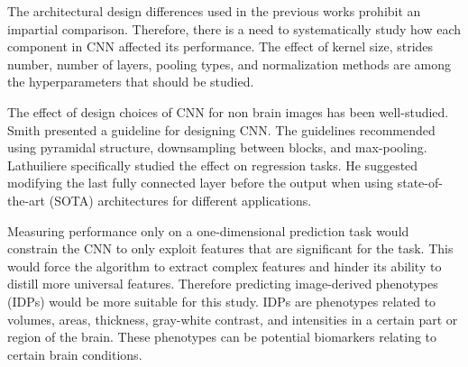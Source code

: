 \documentclass{article}
\begin{document}
    The architectural design differences used in the previous works prohibit an impartial comparison. 
    Therefore, there is a need to systematically study how each component in CNN affected its performance. 
    The effect of kernel size, strides number, number of layers, pooling types, and normalization methods are among the hyperparameters that should be studied.
    
    The effect of design choices of CNN for non brain images has been well-studied. 
    Smith\cite{smith} presented a guideline for designing CNN. 
    The guidelines recommended using pyramidal structure, downsampling between blocks, and max-pooling. 
    Lathuiliere\cite{lath} specifically studied the effect on regression tasks. 
    He suggested modifying the last fully connected layer before the output when using state-of-the-art (SOTA) architectures for different applications.

    Measuring performance only on a one-dimensional prediction task would constrain the CNN to only exploit features that are significant for the task. 
    This would force the algorithm to extract complex features and hinder its ability to distill more universal features. 
    Therefore predicting image-derived phenotypes (IDPs) would be more suitable for this study. 
    IDPs are phenotypes related to volumes, areas, thickness, gray-white contrast, and intensities in a certain part or region of the brain. 
    These phenotypes can be potential biomarkers relating to certain brain conditions. 
\end{document}
